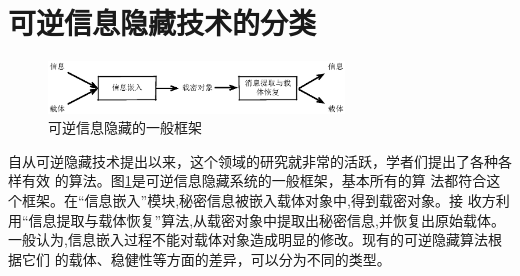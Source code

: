 \section{可逆信息隐藏技术的分类}
\label{s:type_application_reversible_data_hiding}
\begin{figure}[!ht]
\centering 
\includegraphics[width=0.7\textwidth]{figures/reversible_framework.eps}
\caption{可逆信息隐藏的一般框架}
\label{fig:revers_framework}
\end{figure}
自从可逆隐藏技术提出以来，这个领域的研究就非常的活跃，学者们提出了各种各样有效
的算法。图\ref{fig:revers_framework}是可逆信息隐藏系统的一般框架，基本所有的算
法都符合这个框架。在``信息嵌入''模块,秘密信息被嵌入载体对象中,得到载密对象。接
收方利用``信息提取与载体恢复''算法,从载密对象中提取出秘密信息,并恢复出原始载体。
一般认为,信息嵌入过程不能对载体对象造成明显的修改。现有的可逆隐藏算法根据它们
的载体、稳健性等方面的差异，可以分为不同的类型。\\
\vspace{-8mm}
